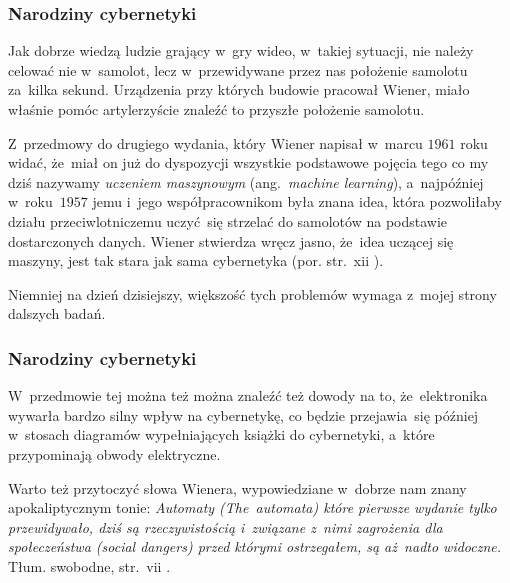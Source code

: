 \documentclass[10pt,t]{beamer}
\begin{document}
\begin{frame}
  \frametitle{Narodziny cybernetyki}


  Jak dobrze wiedzą ludzie grający w~gry wideo, w~takiej sytuacji, nie
  należy celować nie w~samolot, lecz w~przewidywane przez nas
  położenie samolotu za~kilka sekund. Urządzenia przy których budowie
  pracował Wiener, miało właśnie pomóc artylerzyście znaleźć to przyszłe
  położenie samolotu.

  Z~przedmowy do drugiego wydania, który Wiener napisał w~marcu $1961$ roku
  widać, że~miał on już do dyspozycji wszystkie podstawowe pojęcia tego
  co my dziś nazywamy \textit{uczeniem maszynowym} (ang.~\textit{machine
    learning}), a~najpóźniej w~roku~$1957$ jemu i~jego współpracownikom
  była znana idea, która pozwoliłaby działu przeciwlotniczemu uczyć~się
  strzelać do samolotów na podstawie dostarczonych danych. Wiener stwierdza
  wręcz jasno, że~idea uczącej się maszyny, jest tak stara jak sama
  cybernetyka (por. str.~xii
  \parencite{Wiener-Cybernetics-Second-edition-Pub-2016}).

  Niemniej na dzień dzisiejszy, większość tych problemów wymaga z~mojej
  strony dalszych badań.

\end{frame}





\begin{frame}
  \frametitle{Narodziny cybernetyki}


  W~przedmowie tej można też można znaleźć też dowody na to,
  że~elektronika wywarła bardzo silny wpływ na cybernetykę, co będzie
  przejawia~się później w~stosach diagramów wypełniających książki do
  cybernetyki, a~które przypominają obwody elektryczne.

  Warto też przytoczyć słowa Wienera, wypowiedziane w~dobrze nam znany
  apokaliptycznym tonie:
  \textit{Automaty (\textit{The~automata}) które pierwsze wydanie tylko
    przewidywało, dziś są rzeczywistością i~związane z~nimi zagrożenia dla
    społeczeństwa (\textit{social dangers}) przed którymi ostrzegałem, są
    aż~nadto widoczne.} Tłum. swobodne, str.~vii
  \parencite{Wiener-Cybernetics-Second-edition-Pub-2016}.


\end{frame}
\end{document}
